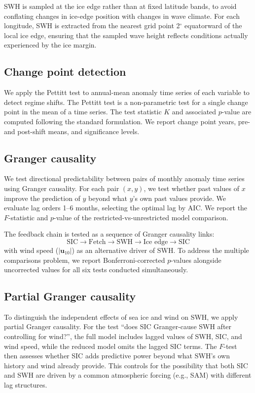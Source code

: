\documentclass[11pt]{article}
\begin{document}
SWH is sampled at the ice edge rather than at fixed latitude bands, to avoid conflating changes in ice-edge position with changes in wave climate. For each longitude, SWH is extracted from the nearest grid point 2$^\circ$ equatorward of the local ice edge, ensuring that the sampled wave height reflects conditions actually experienced by the ice margin.

\subsection{Change point detection}

We apply the Pettitt test\cite{Pettitt1979} to annual-mean anomaly time series of each variable to detect regime shifts. The Pettitt test is a non-parametric test for a single change point in the mean of a time series. The test statistic $K$ and associated $p$-value are computed following the standard formulation. We report change point years, pre- and post-shift means, and significance levels.

\subsection{Granger causality}

We test directional predictability between pairs of monthly anomaly time series using Granger causality\cite{Granger1969}. For each pair $(x, y)$, we test whether past values of $x$ improve the prediction of $y$ beyond what $y$'s own past values provide. We evaluate lag orders 1--6 months, selecting the optimal lag by AIC. We report the $F$-statistic and $p$-value of the restricted-vs-unrestricted model comparison.

The feedback chain is tested as a sequence of Granger causality links:
\[
\text{SIC} \to \text{Fetch} \to \text{SWH} \to \text{Ice edge} \to \text{SIC}
\]
with wind speed ($|\mathbf{u}_{10}|$) as an alternative driver of SWH. To address the multiple comparisons problem, we report Bonferroni-corrected $p$-values alongside uncorrected values for all six tests conducted simultaneously.

\subsection{Partial Granger causality}

To distinguish the independent effects of sea ice and wind on SWH, we apply partial Granger causality. For the test ``does SIC Granger-cause SWH after controlling for wind?'', the full model includes lagged values of SWH, SIC, and wind speed, while the reduced model omits the lagged SIC terms. The $F$-test then assesses whether SIC adds predictive power beyond what SWH's own history and wind already provide. This controls for the possibility that both SIC and SWH are driven by a common atmospheric forcing (e.g., SAM) with different lag structures.
\end{document}

